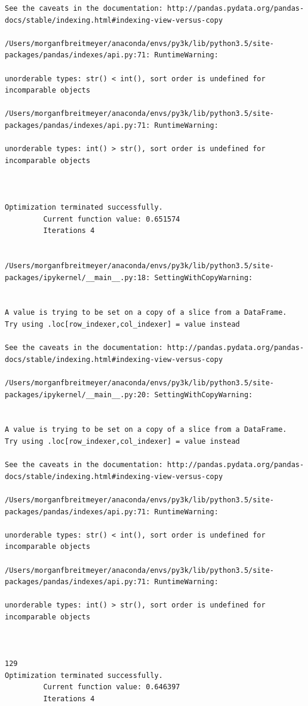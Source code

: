 \begin{lstlisting}
See the caveats in the documentation: http://pandas.pydata.org/pandas-docs/stable/indexing.html#indexing-view-versus-copy

/Users/morganfbreitmeyer/anaconda/envs/py3k/lib/python3.5/site-packages/pandas/indexes/api.py:71: RuntimeWarning:

unorderable types: str() < int(), sort order is undefined for incomparable objects

/Users/morganfbreitmeyer/anaconda/envs/py3k/lib/python3.5/site-packages/pandas/indexes/api.py:71: RuntimeWarning:

unorderable types: int() > str(), sort order is undefined for incomparable objects



Optimization terminated successfully.
         Current function value: 0.651574
         Iterations 4


/Users/morganfbreitmeyer/anaconda/envs/py3k/lib/python3.5/site-packages/ipykernel/__main__.py:18: SettingWithCopyWarning:


A value is trying to be set on a copy of a slice from a DataFrame.
Try using .loc[row_indexer,col_indexer] = value instead

See the caveats in the documentation: http://pandas.pydata.org/pandas-docs/stable/indexing.html#indexing-view-versus-copy

/Users/morganfbreitmeyer/anaconda/envs/py3k/lib/python3.5/site-packages/ipykernel/__main__.py:20: SettingWithCopyWarning:


A value is trying to be set on a copy of a slice from a DataFrame.
Try using .loc[row_indexer,col_indexer] = value instead

See the caveats in the documentation: http://pandas.pydata.org/pandas-docs/stable/indexing.html#indexing-view-versus-copy

/Users/morganfbreitmeyer/anaconda/envs/py3k/lib/python3.5/site-packages/pandas/indexes/api.py:71: RuntimeWarning:

unorderable types: str() < int(), sort order is undefined for incomparable objects

/Users/morganfbreitmeyer/anaconda/envs/py3k/lib/python3.5/site-packages/pandas/indexes/api.py:71: RuntimeWarning:

unorderable types: int() > str(), sort order is undefined for incomparable objects



129
Optimization terminated successfully.
         Current function value: 0.646397
         Iterations 4



\end{lstlisting}
